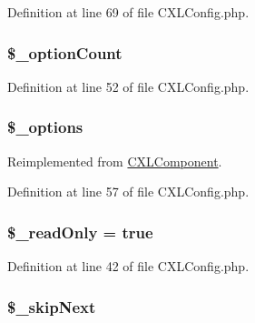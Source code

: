 Definition at line 69 of file CXLConfig.php.

\hypertarget{classCXLConfig_acbd6cae35f3bb2f2daac19326e69c6f3}{
\subsubsection[{\$\_\-optionCount}]{\setlength{\rightskip}{0pt plus 5cm}\$\_\-optionCount}}
\label{classCXLConfig_acbd6cae35f3bb2f2daac19326e69c6f3}


Definition at line 52 of file CXLConfig.php.

\hypertarget{classCXLConfig_a1bebdc689c84eee59ad24c77e5531762}{
\subsubsection[{\$\_\-options}]{\setlength{\rightskip}{0pt plus 5cm}\$\_\-options}}
\label{classCXLConfig_a1bebdc689c84eee59ad24c77e5531762}


Reimplemented from \hyperlink{classCXLComponent_a1bebdc689c84eee59ad24c77e5531762}{CXLComponent}.



Definition at line 57 of file CXLConfig.php.

\hypertarget{classCXLConfig_aa2562d06c3ceeb66f5dd4410d11739ad}{
\subsubsection[{\$\_\-readOnly}]{\setlength{\rightskip}{0pt plus 5cm}\$\_\-readOnly = true}}
\label{classCXLConfig_aa2562d06c3ceeb66f5dd4410d11739ad}


Definition at line 42 of file CXLConfig.php.

\hypertarget{classCXLConfig_afea2c33a564049f3607b21952dc4e6bf}{
\subsubsection[{\$\_\-skipNext}]{\setlength{\rightskip}{0pt plus 5cm}\$\_\-skipNext}}
\label{classCXLConfig_afea2c33a564049f3607b21952dc4e6bf}



